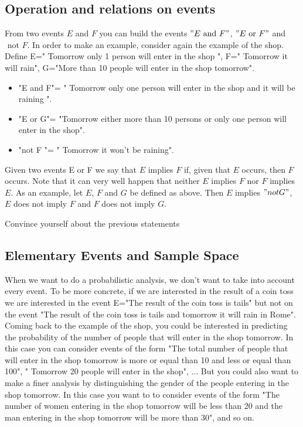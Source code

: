 \documentclass[12pt]{article}
\newcommand{\<}{{\langle \!\! \langle}}
\renewcommand{\>}{{\rangle \!\! \rangle}}
\begin{document}
\subsection{Operation and relations on events}

From two events $E$ and $F$ you can build the events $"E \textrm{ and }   F"$, $ "E \textrm{ or } F"$ and $ \textrm{ not } F$. In order to make an example, consider again the example of the shop. Define E=" Tomorrow only 1 person will enter in the shop ", F=" Tomorrow it will rain", G="More than 10 people will enter in the shop tomorrow". 

\begin{itemize}

	\item "E and F"= " Tomorrow only one person will enter in the shop and it will be raining ".
	\item "E or G"= "Tomorrow either more than 10 persons or only one person will enter in the shop".
	\item "not F "= " Tomorrow it won't be raining".

\end{itemize}

Given two events E or F we say that $E$ implies $F$ if, given that $E$ occurs, then $F$ occurs. Note that it can very well happen that neither $E$ implies $F$ nor $F$ implies $E$. As an example, let $E$, $F$ and $G$ be defined as above. Then $E$ implies $"not G"$, $E$ does not imply $F$ and $F$ does not imply $G$. 

\begin{exercise}
Convince yourself about the previous statements
\end{exercise}   
 

\subsection{Elementary Events and Sample Space}

When we want to do a probabilistic analysis, we don't want to take into account every event. To be more concrete, if we are interested in the result of a coin toss we are interested in the event E="The result of the coin toss is tails" but not on the event "The result of the coin toss is tails and tomorrow it will rain in Rome".\\
 Coming back to the example of the shop, you could be interested in predicting the probability of the number of people that will enter in the shop tomorrow. In this case you can consider events of the form "The total number of people that will enter in the shop tomorrow is more or equal than 10 and less or equal than 100", " Tomorrow 20 people will enter in the shop", ... But you could also  want to make a finer analysis by distinguishing the gender of the people entering in the shop tomorrow. In this case you want to to consider events of the form "The number of women entering in the shop tomorrow will be less than 20 and the man entering in the shop tomorrow will be more than 30", and so on.
\end{document}
